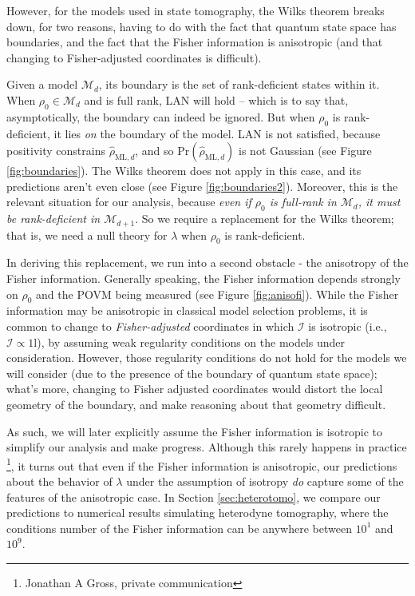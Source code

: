 \documentclass[aps,pra, twocolumn]{revtex4-1}
\newcommand{\M}{\mathcal{M}}
\newcommand{\Id}{\mathbb{I}}
\def\Id{1\!\mathrm{l}}
\newcommand{\rhohat}{\hat{\rho}}
\newcommand{\rhoML}[1]{\rhohat_{\scriptscriptstyle{\mathrm{ML},#1}}}
\begin{document}
However, for the models used in state tomography, the Wilks theorem breaks down, for two reasons, having to do with the fact that quantum state space has boundaries, and the fact that the Fisher information is anisotropic (and that changing to Fisher-adjusted coordinates is difficult).

Given a model $\M_{d}$, its boundary is the set of rank-deficient states within it. When $\rho_{0}\in \M_{d}$ and is full rank, LAN will hold -- which is to say that, asymptotically, the boundary can indeed be ignored. But when $\rho_{0}$ is rank-deficient, it lies \emph{on} the boundary of the model.  LAN is not satisfied, because positivity constrains $\rhoML{d}$, and so $\mathrm{Pr}(\rhoML{d})$ is not Gaussian (see Figure \ref{fig:boundaries}). The Wilks theorem does not apply in this case, and its predictions aren't even close (see Figure \ref{fig:boundaries2}). Moreover, this is the relevant situation for our analysis, because \emph{even if $\rho_{0}$ is full-rank in $\M_{d}$, it must be rank-deficient in $\M_{d+1}$}. So we require a replacement for the Wilks theorem; that is, we need a null theory for $\lambda$ when $\rho_0$ is rank-deficient.

In deriving this replacement, we run into a second obstacle - the anisotropy of the Fisher information. Generally speaking, the Fisher information depends strongly on $\rho_{0}$ and the POVM being measured (see Figure \ref{fig:anisofi}). While the Fisher information may  be anisotropic in classical model selection problems, it is common to change to \emph{Fisher-adjusted} coordinates in which $\mathcal{I}$ is isotropic (i.e., $\mathcal{I} \propto \Id$), by assuming weak regularity conditions on the models under consideration. However, those regularity conditions do not hold for the models we will consider (due to the presence of the boundary of quantum state space); what's more, changing to Fisher adjusted coordinates would distort the local geometry of the boundary, and make reasoning about that geometry difficult.

As such, we will later explicitly assume the Fisher information is isotropic to simplify our analysis and make progress. Although this rarely happens in practice \footnote{Jonathan A Gross, private communication}, it turns out that even if the Fisher information is anisotropic, our predictions about the behavior of $\lambda$ under the assumption of isotropy \emph{do} capture some of the features of the anisotropic case. In Section \ref{sec:heterotomo}, we compare our predictions to numerical results simulating heterodyne tomography, where the conditions number of the Fisher information can be anywhere between $10^{1}$ and $10^{9}$.
\end{document}
